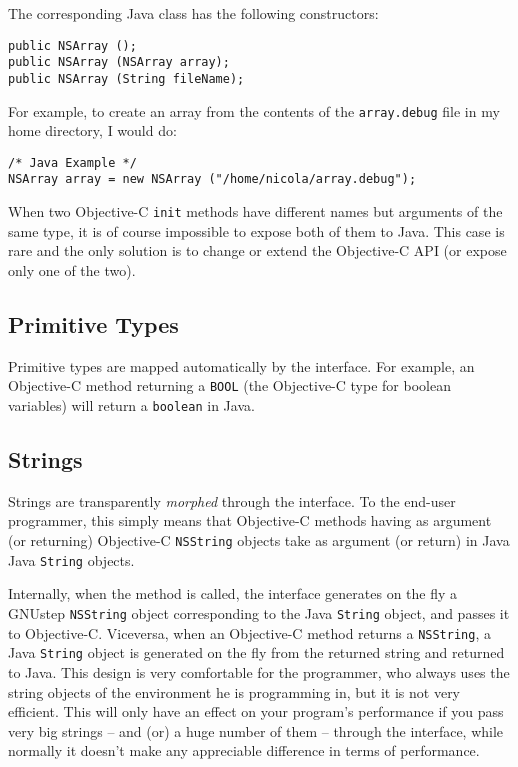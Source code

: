 The corresponding Java class has the following constructors:
\begin{verbatim}
public NSArray ();
public NSArray (NSArray array);
public NSArray (String fileName);
\end{verbatim}

For example, to create an array from the contents of the
\texttt{array.debug} file in my home directory, I would do:
\begin{verbatim}
/* Java Example */
NSArray array = new NSArray ("/home/nicola/array.debug");
\end{verbatim}

When two Objective-C \texttt{init} methods have different names but
arguments of the same type, it is of course impossible to expose both
of them to Java.  This case is rare and the only solution is to change
or extend the Objective-C API (or expose only one of the two).

\subsection{Primitive Types}

Primitive types are mapped automatically by the interface.  For
example, an Objective-C method returning a \texttt{BOOL} (the
Objective-C type for boolean variables) will return a \texttt{boolean}
in Java.

\subsection{Strings}

Strings are transparently \emph{morphed} through the interface.  To
the end-user programmer, this simply means that Objective-C methods
having as argument (or returning) Objective-C \texttt{NSString}
objects take as argument (or return) in Java Java \texttt{String}
objects.

Internally, when the method is called, the interface generates on the
fly a GNUstep \texttt{NSString} object corresponding to the Java
\texttt{String} object, and passes it to Objective-C.  Viceversa, when
an Objective-C method returns a \texttt{NSString}, a Java
\texttt{String} object is generated on the fly from the returned string and
returned to Java.  This design is very comfortable for the programmer,
who always uses the string objects of the environment he is
programming in, but it is not very efficient.  This will only have an
effect on your program's performance if you pass very big strings --
and (or) a huge number of them -- through the interface, while normally 
it doesn't make any appreciable difference in terms of performance.

